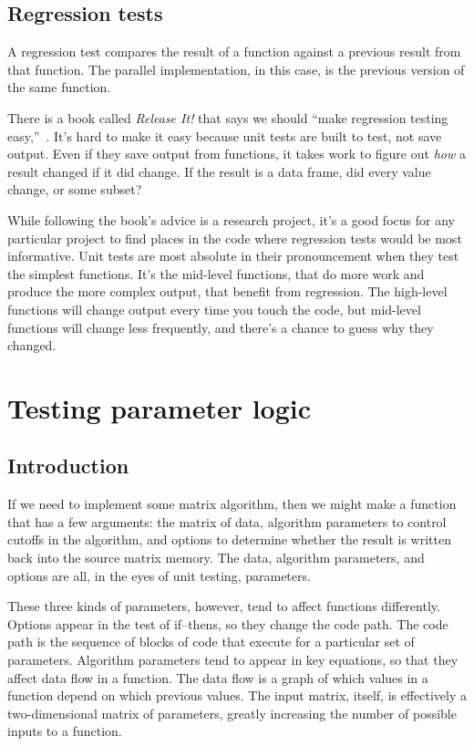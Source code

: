\documentclass[fleqn,10pt]{olplainarticle}
\begin{document}
\subsection{Regression tests}
A regression test compares the result of a function against a previous
result from that function. The parallel implementation, in this case,
is the previous version of the same function.

There is a book called \emph{Release It!} that says we should
``make regression testing easy,''~\citep{nygard2018release}. It's hard to make it easy
because unit tests are built to test, not save output. Even if
they save output from functions, it takes work to figure out
\emph{how} a result changed if it did change. If the result
is a data frame, did every value change, or some subset?

While following the book's advice is a research project,
it's a good focus for any particular project to find places in the
code where regression tests would be most informative. Unit tests are
most absolute in their pronouncement when they test the simplest
functions. It's the mid-level functions, that do more work
and produce the more complex output, that benefit from regression.
The high-level functions will change output every time you touch
the code, but mid-level functions will change less frequently,
and there's a chance to guess why they changed.



\section{Testing parameter logic}\label{sec:parameter-logic}
\subsection{Introduction}\label{sec:parameter-introduction}
If we need to implement some matrix algorithm, then
we might make a function that has a few arguments: the matrix of data, algorithm parameters
to control cutoffs in the algorithm, and options to determine whether
the result is written back into the source matrix memory.
The data, algorithm parameters, and options are all, in the eyes of unit testing,
parameters.

These three kinds of parameters, however, tend to affect functions
differently. Options appear in the test of if--thens, so they change
the code path. The code path is the sequence of blocks of code that execute
for a particular set of parameters.
Algorithm parameters tend to appear in key equations, so that they
affect data flow in a function. The data flow is a graph
of which values in a function depend on which previous values.
The input matrix, itself, is effectively a two-dimensional matrix of
parameters, greatly increasing the number of possible inputs to a function.
\end{document}
